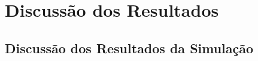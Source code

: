\chapter{Discussão dos Resultados}
\label{chap:discussao}

\section{Discussão dos Resultados da Simulação}
